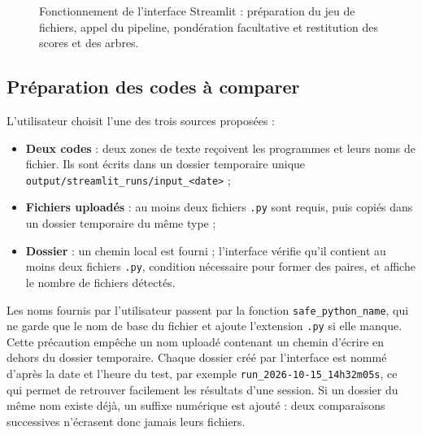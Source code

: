 \documentclass[12pt,a4paper,oneside]{report}
\begin{document}
\begin{figure}[htbp]
{%
}
\caption{Fonctionnement de l'interface Streamlit : préparation du jeu de
fichiers, appel du pipeline, pondération facultative et restitution des
scores et des arbres.}
\label{fig:streamlit}
\end{figure}

\subsection{Préparation des codes à comparer}

L'utilisateur choisit l'une des trois sources proposées :
\begin{itemize}
  \item \textbf{Deux codes} : deux zones de texte reçoivent les programmes et
        leurs noms de fichier. Ils sont écrits dans un dossier temporaire
        unique \texttt{output/streamlit\_runs/input\_<date>} ;
  \item \textbf{Fichiers uploadés} : au moins deux fichiers \texttt{.py} sont
        requis, puis copiés dans un dossier temporaire du même type ;
  \item \textbf{Dossier} : un chemin local est fourni ; l'interface vérifie
        qu'il contient au moins deux fichiers \texttt{.py}, condition
        nécessaire pour former des paires, et affiche le nombre de fichiers
        détectés.
\end{itemize}

Les noms fournis par l'utilisateur passent par la fonction
\texttt{safe\_python\_name}, qui ne garde que le nom de base du fichier et
ajoute l'extension \texttt{.py} si elle manque. Cette précaution empêche un nom
uploadé contenant un chemin d'écrire en dehors du dossier temporaire.
Chaque dossier créé par l'interface est nommé d'après la date et l'heure du
test, par exemple \texttt{run\_2026-10-15\_14h32m05s}, ce qui permet de
retrouver facilement les résultats d'une session. Si un dossier du même nom
existe déjà, un suffixe numérique est ajouté : deux comparaisons successives
n'écrasent donc jamais leurs fichiers.
\end{document}

